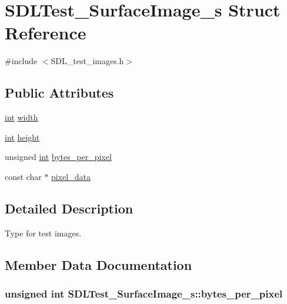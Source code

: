 \hypertarget{struct_s_d_l_test___surface_image__s}{}\section{S\+D\+L\+Test\+\_\+\+Surface\+Image\+\_\+s Struct Reference}
\label{struct_s_d_l_test___surface_image__s}


{\ttfamily \#include $<$S\+D\+L\+\_\+test\+\_\+images.\+h$>$}

\subsection*{Public Attributes}
\begin{DoxyCompactItemize}
\item 
\hyperlink{_s_d_l__thread_8h_a6a64f9be4433e4de6e2f2f548cf3c08e}{int} \hyperlink{struct_s_d_l_test___surface_image__s_a3cbacf6b015a22832ab4d3f509719609}{width}
\item 
\hyperlink{_s_d_l__thread_8h_a6a64f9be4433e4de6e2f2f548cf3c08e}{int} \hyperlink{struct_s_d_l_test___surface_image__s_a310092874695556e4b7f1f63aec24213}{height}
\item 
unsigned \hyperlink{_s_d_l__thread_8h_a6a64f9be4433e4de6e2f2f548cf3c08e}{int} \hyperlink{struct_s_d_l_test___surface_image__s_a2daf91bab3d79fb9dfa25e8ade43e606}{bytes\+\_\+per\+\_\+pixel}
\item 
const char $\ast$ \hyperlink{struct_s_d_l_test___surface_image__s_acf2d3006bea5690f564d3003d1512fa7}{pixel\+\_\+data}
\end{DoxyCompactItemize}


\subsection{Detailed Description}
Type for test images. 

\subsection{Member Data Documentation}
\subsubsection[{\texorpdfstring{bytes\+\_\+per\+\_\+pixel}{bytes_per_pixel}}]{\setlength{\rightskip}{0pt plus 5cm}unsigned {\bf int} S\+D\+L\+Test\+\_\+\+Surface\+Image\+\_\+s\+::bytes\+\_\+per\+\_\+pixel}\hypertarget{struct_s_d_l_test___surface_image__s_a2daf91bab3d79fb9dfa25e8ade43e606}{}\label{struct_s_d_l_test___surface_image__s_a2daf91bab3d79fb9dfa25e8ade43e606}
